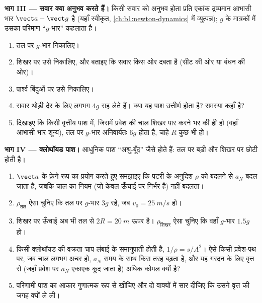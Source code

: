 \begin{problem}
\medskip
\noindent\textbf{भाग III --- सवार क्या अनुभव करते हैं।}
किसी सवार को अनुभव होता प्रति एकांक द्रव्यमान आभासी भार $\vect a - \vect g$
है (यहाँ स्वीकृत, \cref{ch:b1:newton-dynamics} में व्युत्पन्न); $g$ के
मात्रकों में उसका परिमाण ``$g$-भार'' कहलाता है।
\begin{enumerate}[resume]
  \item तल पर $g$-भार निकालिए।
  \item शिखर पर उसे निकालिए, और बताइए कि सवार किस ओर दबता है (सीट की ओर या
        बंधन की ओर)।
  \item पार्श्व बिंदुओं पर उसे निकालिए।
  \item सवार थोड़ी देर के लिए लगभग $4g$ सह लेते हैं। क्या यह पाश उत्तीर्ण
        होता है? समस्या कहाँ है?
  \item दिखाइए कि किसी वृत्तीय पाश में, जिसमें प्रवेश की चाल शिखर पार करने
        भर की ही हो (वहाँ आभासी भार शून्य), तल पर $g$-भार अनिवार्यतः $6g$
        होता है, चाहे $R$ कुछ भी हो।
\end{enumerate}

\medskip
\noindent\textbf{भाग IV --- क्लोथॉयड पाश।}
आधुनिक पाश ``अश्रु-बूँद'' जैसे होते हैं:  तल पर बड़ी और शिखर
पर छोटी होती है।
\begin{enumerate}[resume]
  \item $\vect a$ के फ्रेने रूप का प्रयोग करते हुए समझाइए कि पटरी के अनुदिश
        $\rho$ को बदलने से $a_N$ बदल जाता है, जबकि चाल का नियम (जो केवल
        ऊँचाई पर निर्भर है) नहीं बदलता।
  \item $\rho_{\text{तल}}$ ऐसा चुनिए कि तल पर $g$-भार $3g$ रहे, जब
        $v_0 = \qty{25}{m/s}$ हो।
  \item शिखर पर ऊँचाई अब भी तल से $2R = \qty{20}{m}$ ऊपर है।
        $\rho_{\text{शिखर}}$ ऐसा चुनिए कि वहाँ $g$-भार $1.5g$ हो।
  \item किसी क्लोथॉयड की वक्रता चाप लंबाई के समानुपाती होती है,
        $1/\rho = s/A^2$। ऐसे किसी प्रवेश-पथ पर, जब चाल लगभग अचर हो, $a_N$
        समय के साथ किस तरह बढ़ता है, और यह गरदन के लिए वृत्त से (जहाँ प्रवेश
        पर $a_N$ एकाएक कूद जाता है) अधिक कोमल क्यों है?
  \item परिणामी पाश का आकार गुणात्मक रूप से खींचिए और दो वाक्यों में सार
        दीजिए कि उसने वृत्त की जगह क्यों ले ली।
\end{enumerate}


\end{problem}
